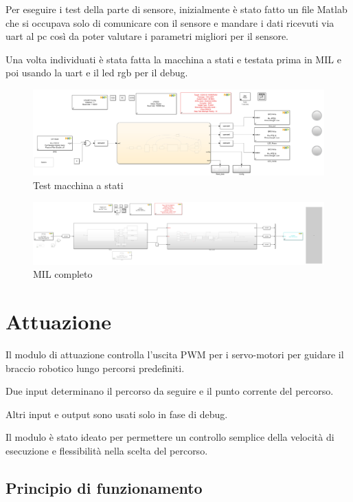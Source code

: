 \documentclass[12pt]{report}
\begin{document}
Per eseguire i test della parte di sensore, inizialmente è stato fatto un file Matlab che si occupava solo di comunicare con il sensore e mandare i dati ricevuti via uart al pc così da poter valutare i parametri migliori per il sensore.

Una volta individuati è stata fatta la macchina a stati e testata prima in MIL e poi usando la uart e il led rgb per il debug.

\begin{figure}
    \includegraphics[width=\textwidth]{Immagini_sensore/test_stateflow_2.png}
    \caption{Test macchina a stati}
\end{figure}

\begin{figure}[h] 
    \centering
    \includegraphics[width=\textwidth]{Immagini_sensore/Matlab_completo.png}
    \caption{MIL completo}
\end{figure}

\chapter{Attuazione}

Il modulo di attuazione controlla l'uscita PWM per i servo-motori per guidare il braccio robotico lungo percorsi predefiniti.

Due input determinano il percorso da seguire e il punto corrente del percorso.

Altri input e output sono usati solo in fase di debug.

Il modulo è stato ideato per permettere un controllo semplice della velocità di esecuzione e flessibilità nella scelta del percorso.

\section{Principio di funzionamento}
\end{document}
